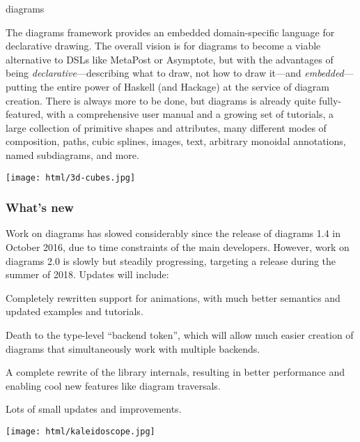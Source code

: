 \begin{hcarentry}[updated]{diagrams}
\makeheader

The diagrams framework provides an embedded domain-specific language for
declarative drawing. The overall vision is for diagrams to become a viable
alternative to DSLs like MetaPost or Asymptote, but with the advantages of
being \emph{declarative}---describing what to draw, not how to draw it---and
\emph{embedded}---putting the entire power of Haskell (and Hackage) at the
service of diagram creation. There is always more to be done, but diagrams is
already quite fully-featured, with a comprehensive user manual and a growing
set of tutorials, a large collection of primitive shapes and attributes, many
different modes of composition, paths, cubic splines, images, text, arbitrary
monoidal annotations, named subdiagrams, and more.

\begin{center}
\texttt{[image: html/3d-cubes.jpg]}
\end{center}

\subsubsection*{What's new}

Work on diagrams has slowed considerably since the release of diagrams
1.4 in October 2016, due to time constraints of the main developers.
However, work on diagrams 2.0 is slowly but steadily progressing,
targeting a release during the summer of 2018.  Updates will include:

\begin{compactitem}
\item Completely rewritten support for animations, with much better
  semantics and updated examples and tutorials.
\item Death to the type-level ``backend token'', which will allow much
  easier creation of diagrams that simultaneously work with multiple
  backends.
\item A complete rewrite of the library internals, resulting in better
  performance and enabling cool new features like diagram traversals.
\item Lots of small updates and improvements.
\end{compactitem}

\begin{center}
\texttt{[image: html/kaleidoscope.jpg]}
\end{center}


\end{hcarentry}
